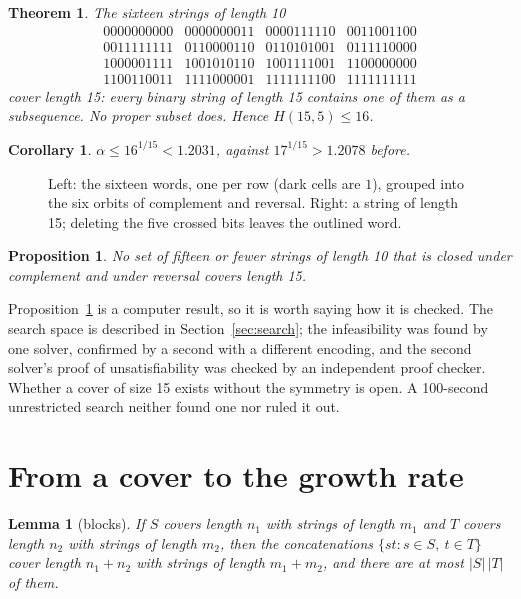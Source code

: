 \documentclass[11pt]{article}
\newtheorem{theorem}{Theorem}
\newtheorem{corollary}{Corollary}
\newtheorem{lemma}{Lemma}
\newtheorem{proposition}{Proposition}
\theoremstyle{remark}
\begin{document}
\begin{theorem}\label{thm:main}
The sixteen strings of length 10
\[
\begin{array}{llll}
0000000000 & 0000000011 & 0000111110 & 0011001100\\
0011111111 & 0110000110 & 0110101001 & 0111110000\\
1000001111 & 1001010110 & 1001111001 & 1100000000\\
1100110011 & 1111000001 & 1111111100 & 1111111111
\end{array}
\]
cover length 15: every binary string of length 15 contains one of them as a subsequence. No proper subset
does. Hence $H(15,5)\le16$.
\end{theorem}

\begin{corollary}\label{cor:rate}
$\alpha\le16^{1/15}<1.2031$, against $17^{1/15}>1.2078$ before.
\end{corollary}

\begin{figure}[ht]
\centering

\caption{Left: the sixteen words, one per row (dark cells are $1$), grouped into the six orbits of complement
and reversal. Right: a string of length 15; deleting the five crossed bits leaves the outlined word.}
\label{fig:cover}
\end{figure}

\begin{proposition}\label{prop:sym}
No set of fifteen or fewer strings of length 10 that is closed under complement and under reversal covers
length 15.
\end{proposition}

Proposition~\ref{prop:sym} is a computer result, so it is worth saying how it is checked. The search space
is described in Section~\ref{sec:search}; the infeasibility was found by one solver, confirmed by a second with
a different encoding, and the second solver's proof of unsatisfiability was checked by an independent proof
checker. Whether a cover of size 15 exists without the symmetry is open. A 100-second unrestricted search
neither found one nor ruled it out.

\section{From a cover to the growth rate}

\begin{lemma}[blocks]\label{lem:blocks}
If $S$ covers length $n_1$ with strings of length $m_1$ and $T$ covers length $n_2$ with strings of length
$m_2$, then the concatenations $\{st:s\in S,\ t\in T\}$ cover length $n_1+n_2$ with strings of length
$m_1+m_2$, and there are at most $|S|\,|T|$ of them.
\end{lemma}
\end{document}
